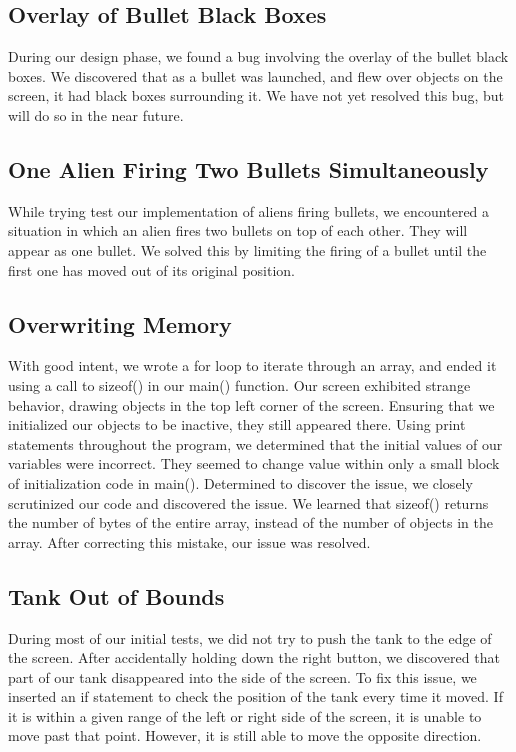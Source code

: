 \documentclass[11pt,letter,oneside]{report}
\begin{document}
\subsection{Overlay of Bullet Black Boxes}
During our design phase, we found a bug involving the overlay of the bullet black boxes. We discovered that as a bullet was launched, and flew over objects on the screen, it had black boxes surrounding it. We have not yet resolved this bug, but will do so in the near future.

\subsection{One Alien Firing Two Bullets Simultaneously}
While trying test our implementation of aliens firing bullets, we encountered a situation in which an alien fires two bullets on top of each other.  They will appear as one bullet.  We solved this by limiting the firing of a bullet until the first one has moved out of its original position. 

\subsection{Overwriting Memory}
With good intent, we wrote a for loop to iterate through an array, and ended it using a call to sizeof() in our main() function. Our screen exhibited strange behavior, drawing objects in the top left corner of the screen. Ensuring that we initialized our objects to be inactive, they still appeared there. Using print statements throughout the program, we determined that the initial values of our variables were incorrect. They seemed to change value within only a small block of initialization code in main(). Determined to discover the issue, we closely scrutinized our code and discovered the issue. We learned that sizeof() returns the number of bytes of the entire array, instead of the number of objects in the array. After correcting this mistake, our issue was resolved.


\subsection{Tank Out of Bounds}
During most of our initial tests, we did not try to push the tank to the edge of the screen. After accidentally holding down the right button, we discovered that part of our tank disappeared into the side of the screen. To fix this issue, we inserted an if statement to check the position of the tank every time it moved. If it is within a given range of the left or right side of the screen, it is unable to move past that point. However, it is still able to move the opposite direction.
\end{document}
